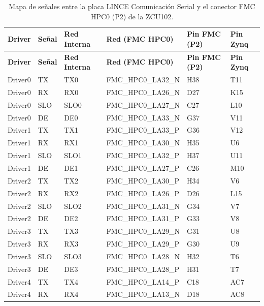 {\footnotesize
\begin{longtable}{llllll}
    \hline
    \textbf{Driver} & \textbf{Señal} & \textbf{Red Interna} & \textbf{Red (FMC HPC0)} & \textbf{Pin FMC (P2)} & \textbf{Pin Zynq} \\
    \hline
    \endfirsthead
    \hline
    \textbf{Driver} & \textbf{Señal} & \textbf{Red Interna} & \textbf{Red (FMC HPC0)} & \textbf{Pin FMC (P2)} & \textbf{Pin Zynq} \\
    \hline
    \endhead
    \hline
    \endfoot
    \hline
    \caption{Mapa de señales entre la placa LINCE Comunicación Serial y el conector FMC HPC0 (P2) de la ZCU102.}
    \label{tab:mapa_lince_serial}
    \endlastfoot
    Driver0 & TX  & TX0   & FMC\_HPC0\_LA32\_N      & H38 & T11  \\
    Driver0 & RX  & RX0   & FMC\_HPC0\_LA26\_N      & D27 & K15  \\
    Driver0 & SLO & SLO0  & FMC\_HPC0\_LA27\_N      & C27 & L10  \\
    Driver0 & DE  & DE0   & FMC\_HPC0\_LA33\_N      & G37 & V11  \\
    Driver1 & TX  & TX1   & FMC\_HPC0\_LA33\_P      & G36 & V12  \\
    Driver1 & RX  & RX1   & FMC\_HPC0\_LA30\_N      & H35 & U6   \\
    Driver1 & SLO & SLO1  & FMC\_HPC0\_LA32\_P      & H37 & U11  \\
    Driver1 & DE  & DE1   & FMC\_HPC0\_LA27\_P      & C26 & M10  \\
    Driver2 & TX  & TX2   & FMC\_HPC0\_LA30\_P      & H34 & V6   \\
    Driver2 & RX  & RX2   & FMC\_HPC0\_LA26\_P      & D26 & L15  \\
    Driver2 & SLO & SLO2  & FMC\_HPC0\_LA31\_N      & G34 & V7   \\
    Driver2 & DE  & DE2   & FMC\_HPC0\_LA31\_P      & G33 & V8   \\
    Driver3 & TX  & TX3   & FMC\_HPC0\_LA29\_N      & G31 & U8   \\
    Driver3 & RX  & RX3   & FMC\_HPC0\_LA29\_P      & G30 & U9   \\
    Driver3 & SLO & SLO3  & FMC\_HPC0\_LA28\_N      & H32 & T6   \\
    Driver3 & DE  & DE3   & FMC\_HPC0\_LA28\_P      & H31 & T7   \\
    Driver4 & TX  & TX4   & FMC\_HPC0\_LA14\_P      & C18 & AC7  \\
    Driver4 & RX  & RX4   & FMC\_HPC0\_LA13\_N      & D18 & AC8  \\

\end{longtable}}
